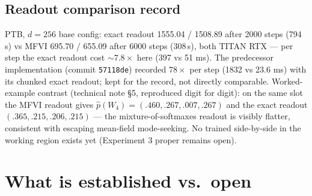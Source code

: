 \documentclass[10pt,a4paper]{article}
\begin{document}
\subsection{Readout comparison record}

PTB, $d{=}256$ base config: exact readout 1555.04 / 1508.89 after 2000 steps (794\,s) vs
MFVI 695.70 / 655.09 after 6000 steps (308\,s), both TITAN RTX --- per step the exact
readout cost ${\sim}7.8\times$ here (397 vs 51 ms). The predecessor implementation (commit
\texttt{57118de}) recorded $78\times$ per step (1832 vs 23.6 ms) with its chunked exact
readout; kept for the record, not directly comparable. Worked-example contrast (technical
note \S5, reproduced digit for digit): on the same slot the MFVI readout gives
$\hat p(W_4) = (.460, .267, .007, .267)$ and the exact readout $(.365, .215, .206, .215)$
--- the mixture-of-softmaxes readout is visibly flatter, consistent with escaping mean-field
mode-seeking. No trained side-by-side in the working region exists yet (Experiment 3 proper
remains open).

\section{What is established vs.\ open}
\end{document}
